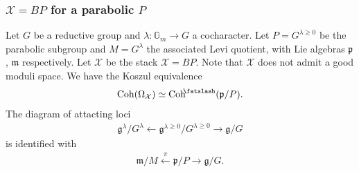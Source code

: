 \documentclass [11pt,oneside,a4paper,mathscr]{amsart}
\makeatletter
\theoremstyle{definition}
\renewcommand{\geq}{\geqslant}
\newcommand{\LL}{\operatorname{L}}
\newcommand{\X}{\mathcal{X}}
\newcommand{\bgm}{B\mathbb{G}_m}
\newcommand{\fg}{\mathfrak{g}}
\newcommand{\fp}{\mathfrak{p}}
\newcommand{\fm}{\mathfrak{m}}
\newcommand{\Coh}{\operatorname{Coh}}
\newcommand{\id}{\operatorname{id}}
\newcommand{\Spec}{\operatorname{Spec}}
\renewcommand{\Im}{\operatorname{Im}}
\newcommand{\shear}{{\mathbin{\mkern-6mu\fatslash}}}
\newcommand{\inclusion}{\ar@<-0.3ex>@{^{(}->}[r]}
\newcommand{\wt}{\mathrm{wt}}
\makeatother
\begin{document}

\subsubsection{$\mathcal{X}=BP$ for a parabolic $P$}\label{subsub:GA1}
Let $G$ be a reductive group and $\lambda \colon \mathbb{G}_m \to G$ a cocharacter. 
Let $P=G^{\lambda \geq 0}$ be the parabolic subgroup and $M=G^{\lambda}$ the associated Levi
quotient, with Lie algebras $\fp$, $\fm$ respectively. 
Let $\X$ be the stack $\X=BP$. Note that $\X$ does not admit 
a good moduli space. 
We have the Koszul equivalence 
\begin{align}\notag
    \Coh(\Omega_{\X}) \simeq \Coh^{\shear}(\mathfrak{p}/P). 
\end{align}
The diagram of attacting loci
\begin{align*}
\fg^{\lambda}/G^{\lambda} \leftarrow \fg^{\lambda \geq 0}/G^{\lambda \geq 0} \to \fg/G
\end{align*}
is identified with 
\begin{align*}
    \fm/M \stackrel{\pi}{\leftarrow} \fp/P \to \fg/G.
\end{align*}
\end{document}
